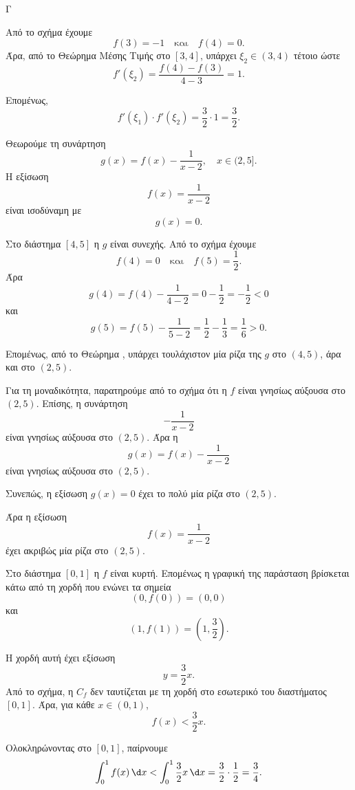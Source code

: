 \begin{thema}{Γ}
\begin{erwthma}
Από το σχήμα έχουμε
\[
f(3)=-1
\quad \text{και}\quad
f(4)=0.
\]
Άρα, από το Θεώρημα Μέσης Τιμής στο $[3,4]$, υπάρχει $\xi_2\in(3,4)$ τέτοιο ώστε
\[
f'(\xi_2)=\frac{f(4)-f(3)}{4-3}
=1.
\]

Επομένως,
\[
f'(\xi_1)\cdot f'(\xi_2)=\frac{3}{2}\cdot 1=\frac{3}{2}.
\]

\item Θεωρούμε τη συνάρτηση
\[
g(x)=f(x)-\frac{1}{x-2},\quad x\in(2,5].
\]
Η εξίσωση
\[
f(x)=\frac{1}{x-2}
\]
είναι ισοδύναμη με
\[
g(x)=0.
\]

Στο διάστημα $[4,5]$ η $g$ είναι συνεχής. Από το σχήμα έχουμε
\[
f(4)=0
\quad \text{και}\quad
f(5)=\frac{1}{2}.
\]
Άρα
\[
g(4)=f(4)-\frac{1}{4-2}=0-\frac{1}{2}=-\frac{1}{2}<0
\]
και
\[
g(5)=f(5)-\frac{1}{5-2}=\frac{1}{2}-\frac{1}{3}=\frac{1}{6}>0.
\]

Επομένως, από το Θεώρημα , υπάρχει τουλάχιστον μία ρίζα της $g$ στο $(4,5)$, άρα και στο $(2,5)$.

Για τη μοναδικότητα, παρατηρούμε από το σχήμα ότι η $f$ είναι γνησίως αύξουσα στο $(2,5)$. Επίσης, η συνάρτηση
\[
-\frac{1}{x-2}
\]
είναι γνησίως αύξουσα στο $(2,5)$. Άρα η
\[
g(x)=f(x)-\frac{1}{x-2}
\]
είναι γνησίως αύξουσα στο $(2,5)$.

Συνεπώς, η εξίσωση $g(x)=0$ έχει το πολύ μία ρίζα στο $(2,5)$.

Άρα η εξίσωση
\[
f(x)=\frac{1}{x-2}
\]
έχει ακριβώς μία ρίζα στο $(2,5)$.

\item Στο διάστημα $[0,1]$ η $f$ είναι κυρτή. Επομένως η γραφική της παράσταση βρίσκεται κάτω από τη χορδή που ενώνει τα σημεία
\[
(0,f(0))=(0,0)
\]
και
\[
\left(1,f(1)\right)=\left(1,\frac{3}{2}\right).
\]

Η χορδή αυτή έχει εξίσωση
\[
y=\frac{3}{2}x.
\]
Από το σχήμα, η $C_f$ δεν ταυτίζεται με τη χορδή στο εσωτερικό του διαστήματος $[0,1]$. Άρα, για κάθε $x\in(0,1)$,
\[
f(x)<\frac{3}{2}x.
\]

Ολοκληρώνοντας στο $[0,1]$, παίρνουμε
\[
\int_0^1 f(x)\,\d x
<
\int_0^1 \frac{3}{2}x\,\d x
=\frac{3}{2}\cdot \frac{1}{2}
=\frac{3}{4}.
\]
\end{erwthma}
\end{thema}



